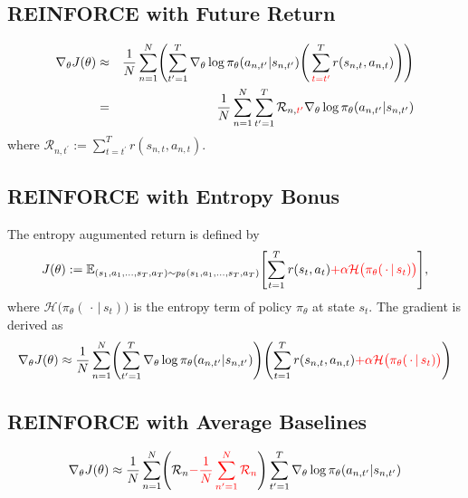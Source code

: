 \documentclass{article}
\begin{document}
\subsection{REINFORCE with Future Return}

\begin{eqnarray}
\nabla_\theta J(\theta)
&\approx& \frac{1}{N} \sum_{n=1}^{N} \Biggl( \sum_{t^\prime=1}^{T} \nabla_\theta \log \pi_\theta (a_{n, t^\prime}|s_{n, t^\prime}) \Biggl(\, \sum_{{\color{red}{t=t^\prime}}}^{T} r(s_{n, t}, a_{n, t}) \Biggr) \Biggr)  \\
&=& \frac{1}{N} \sum_{n=1}^{N} \sum_{t^\prime=1}^{T} \mathcal{R}_{n, {\color{red}{t^\prime}}} \nabla_\theta \log \pi_\theta (a_{n, t^\prime}|s_{n, t^\prime})
\end{eqnarray}
where $\mathcal{R}_{n, t^\prime} := \sum_{t=t^\prime}^T r(s_{n, t}, a_{n, t})$.


\subsection{REINFORCE with Entropy Bonus}
The entropy augumented return is defined by
\begin{eqnarray}
J(\theta) := \mathbb{E}_{(s_1, a_1, \ldots, s_T, a_T) \sim p_\theta(s_1, a_1, \ldots, s_T, a_T)} \Biggl[ \sum_{t=1}^{T} r(s_t, a_t) {\color{red}{ + \alpha \mathcal{H} \bigl(\pi_\theta(\, \cdot \,|\, s_t) \bigr) }}\Biggr],
\end{eqnarray}
where $\mathcal{H} \bigl(\pi_\theta(\, \cdot \,|\, s_t) \bigr)$ is the entropy term of policy $\pi_\theta$ at state $s_t$.
The gradient is derived as
\begin{eqnarray}
\nabla_\theta J(\theta)
\approx \frac{1}{N} \sum_{n=1}^{N} \Biggl( \sum_{t^\prime=1}^{T} \nabla_\theta \log \pi_\theta (a_{n, t^\prime}|s_{n, t^\prime}) \Biggr) \Biggl( \sum_{t=1}^T r(s_{n, t}, a_{n, t}) {\color{red}{ + \alpha \mathcal{H} \bigl(\pi_\theta(\, \cdot \,|\, s_t) \bigr) }} \Biggr)
\end{eqnarray}

\subsection{REINFORCE with Average Baselines}

\begin{eqnarray}
\nabla_\theta J(\theta)
\approx \frac{1}{N} \sum_{n=1}^{N} \Biggl(\mathcal{R}_n {\color{red}{- \frac{1}{N} \sum_{n^\prime=1}^N \mathcal{R}_n }} \Biggr)\sum_{t^\prime=1}^{T} \nabla_\theta \log \pi_\theta (a_{n, t^\prime}|s_{n, t^\prime})
\end{eqnarray}
\end{document}
